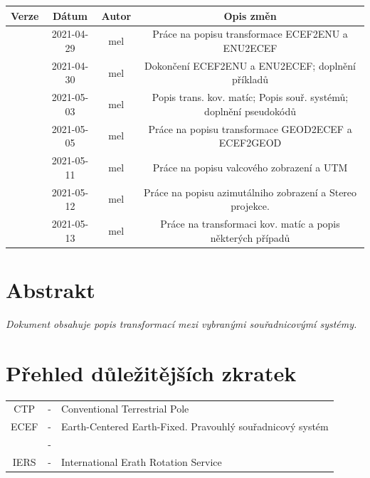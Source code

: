 \documentclass[11pt,a4paper]{article}
\title{\normalfont{libGeo: Popis souřadnicových systémů a transformace mezi vybranými systémy}}
\author{\textsc{Michal Eliaš}}
\date{}
\begin{document}
\maketitle

\setcounter{tocdepth}{2} 


\begin{table}[ht!]
\centering
\begin{tabular}{c|c|c|c}
\hline
Verze & Dátum & Autor & Opis změn \\
\hline
\hline
[0.1] & 2021-04-29 & mel & Práce na popisu transformace ECEF2ENU a ENU2ECEF\\
\hline
[0.2] & 2021-04-30 & mel & Dokončení ECEF2ENU a ENU2ECEF; doplnění příkladů \\
\hline
[0.3] & 2021-05-03 & mel & Popis trans. kov. matíc; Popis souř. systémů; doplnění pseudokódů \\
\hline
[0.4] & 2021-05-05 & mel & Práce na popisu transformace GEOD2ECEF a ECEF2GEOD \\
\hline
[0.5] & 2021-05-11 & mel & Práce na popisu valcového zobrazení a UTM \\
\hline
[0.6] & 2021-05-12 & mel & Práce na popisu azimutálniho zobrazení a Stereo projekce. \\
\hline
[0.7] & 2021-05-13 & mel & Práce na transformaci kov. matíc a popis některých případů \\
\hline

\end{tabular}
\end{table}

\tableofcontents %

\listoffigures %

\listoftables %

\section*{Abstrakt}
\textit{
Dokument obsahuje popis transformací mezi vybranými souřadnicovýmí systémy.
}

\newpage 


\section*{Přehled důležitějších zkratek}

\begin{table}[ht!]
  \begin{tabular}{c c l}
    CTP  & - & Conventional Terrestrial Pole  \\
    ECEF & - & Earth-Centered Earth-Fixed. Pravouhlý souřadnicový systém \\
  & - & \\   
    IERS & - & International Erath Rotation Service \\
  \end{tabular}
\end{table}
\end{document}
